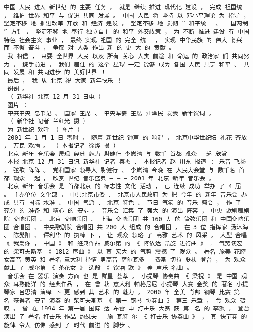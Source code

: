 \documentclass{article}
\begin{document}
\begin{Verbatim}[commandchars=\\\{\}]
 中国 人民 进入 新世纪 的 主要 任务 ， 就是 继续 推进 现代化 建设 ， 完成 祖国统一 ， 维护 世界 和平 与 促进 共同 发展 。 中国 人民 将 坚持 以 邓小平理论 为 指导 ， 坚定不移 地 推进改革 开放 和 经济 建设 ， 坚定不移 地 贯彻 “ 和平统一 、 一国两制 ” 方针 ， 坚定不移 地 奉行 独立自主 的 和平 外交政策 ， 为 不断 推进 建设 有 中国 特色 社会主义 事业 ， 最终 实现 祖国 的 完全 统一 ， 实现 中华民族 的 伟大 复兴 而 不懈 奋斗 ， 争取 对 人类 作出 新 的 更 大 的 贡献 。 
 我 相信 ， 只要 全世界 人民 以及 所有 关心 人类 前途 和 命运 的 政治家 们 共同努力 ， 携手前进 ， 我们 居住 的 这个 星球 一定 能够 成为 各国 人民 共享 和平 、 共同 发展 和 共同进步 的 美好世界 ！ 
 最后 ， 我 从 北京 祝 大家 新年快乐 ！ 
 谢谢 。 
 （ 新华社 北京 12 月 31 日电 ） 
 图片 ： 
 中共中央 总书记 、 国家 主席 、 中央军委 主席 江泽民 发表 新年贺词 。 
 （ 新华社 记者 兰红光 摄 ） 
 为 新世纪 欢呼 （ 图片 ） 
 2001 年 1 月 1 日 零时 ， 随着 新世纪 钟声 的 响起 ， 北京中华世纪坛 礼花 齐放 ， 万民 欢腾 。 （ 本报记者 徐烨 摄 ） 
 北京 新年 音乐会 展现 经典 魅力 尉健行 李岚清 与 数千 首都 观众 一起 欣赏 
 本报 北京 12 月 31 日讯 新华社 记者 秦杰 、 本报记者 赵 川东 报道 ： 乐音 飞扬 ， 弦歌 阵阵 。 党和国家 领导人 尉健行 、 李岚清 今晚 在 人民大会堂 与 数千名 首都 观众 一起 ， 欣赏 世纪 音乐盛典 — — — 2001 年 北京 新年 音乐会 。 
 北京 新年 音乐会 是 首都北京 的 标志性 文化 活动 ， 已 连续 成功 举办 了 4 届 。 主办单位 文化部 ， 中共北京市委 、 北京市人民政府 为 把 今年 的 新年 音乐会 办成 具有 国际 水准 、 中国 气派 、 北京 特色 、 节日 气氛 的 音乐 盛会 ， 作 了 充分 的 准备 和 精心 的 安排 。 音乐会 汇集 了 强大 的 演出 阵容 ， 中央 歌剧舞剧院 交响乐团 、 北京 交响乐团 、 上海 交响乐团 共 160 人 的 管弦乐团 和 中国交响乐团 合唱团 、 中央歌剧院 合唱团 共 200 人 组成 的 合唱团 ， 在 3 位 指挥家 汤沐海 、 陈燮阳 、 谭利华 的 执棒 下 ， 让 观众 领略 了 高雅 艺术 的 风采 。 大型 合唱 《 我爱你 ， 中国 》 和 经典作品 威尔第 的 《 阿依达 凯旋 进行曲 》 ， 气势恢宏 的 柴可夫斯基 《 1812 序曲 》 以 其 宏大 的 气势 震撼 了 观众 。 著名 旅美 花腔 女高音 黄英 和 著名 意大利 抒情 男高音 萨尔瓦多 — 费斯 切拉 联袂 登台 ， 为 观众 献上 了 威尔第 《 茶花女 》 选段 《 饮酒 歌 》 等 声乐 名曲 。 
 音乐会 在 器乐 演奏 方面 也 是 群星 荟萃 。 小提琴 协奏曲 《 梁祝 》 是 中国 观众 耳熟能详 的 经典作品 ， 在 曾 获 意大利 帕格尼尼 小提琴 大赛 金奖 的 著名 小提琴家 吕思清 演绎 下 更 感到 其 艺术 的 魅力 。 2000 年 全美 肖邦 钢琴 比赛 第一名 获得者 安宁 演奏 的 柴可夫斯基 《 第一 钢琴 协奏曲 》 第三 乐章 ， 令 观众 赞叹 。 曾 在 1994 年 第一届 国际 达 布雷 申 打击乐 大赛 获 第二名 的 李飙 ， 登台 演出 了 著名 打击乐 作品 约瑟夫 — 施 瓦特 尔 《 打击乐 协奏曲 》 ， 其 快节奏 的 旋律 令人 仿佛 感到 了 时代 前进 的 脚步 。 

\end{Verbatim}
\end{document}
